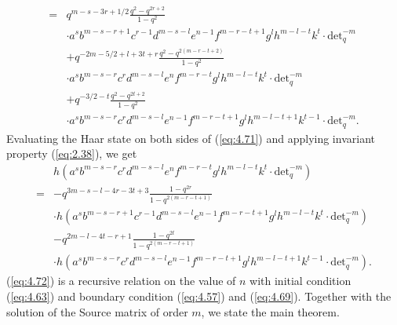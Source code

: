 \documentclass[table,a4paper,reqno]{amsart}
\numberwithin{equation}{section}
\theoremstyle{definition}
\begin{document}
\begin{equation}
\begin{split}
        =&q^{m-s-3r+1/2}\frac{q^2-q^{2r+2}}{1-q^2}\\
        &\cdot a^sb^{m-s-r+1}c^{r-1}d^{m-s-l}e^{n-1}f^{m-r-t+1}g^lh^{m-l-t}k^t\cdot\text{det}_q^{-m}\\
        &+q^{-2m-5/2+l+3t+r}\frac{q^2-q^{2(m-r-t+2)}}{1-q^2}\\
        &\cdot a^sb^{m-s-r}c^rd^{m-s-l}e^{n}f^{m-r-t}g^lh^{m-l-t}k^t\cdot\text{det}_q^{-m}\\
        &+q^{-3/2-t}\frac{q^2-q^{2t+2}}{1-q^2}\\
        &\cdot a^sb^{m-s-r}c^rd^{m-s-l}e^{n-1}f^{m-r-t+1}g^lh^{m-l-t+1}k^{t-1}\cdot\text{det}_q^{-m}.
    \end{split}
\end{equation}
Evaluating the Haar state on both sides of (\ref{eq:4.71}) and applying invariant property (\ref{eq:2.38}), we get
\begin{equation}\label{eq:4.72}
    \begin{split}
        &h\left(a^sb^{m-s-r}c^rd^{m-s-l}e^{n}f^{m-r-t}g^lh^{m-l-t}k^t\cdot\text{det}_q^{-m}\right)\\
        =&-q^{3m-s-l-4r-3t+3}\frac{1-q^{2r}}{1-q^{2(m-r-t+1)}}\\
        &\cdot h\left(a^sb^{m-s-r+1}c^{r-1}d^{m-s-l}e^{n-1}f^{m-r-t+1}g^lh^{m-l-t}k^t\cdot\text{det}_q^{-m}\right)\\
        &-q^{2m-l-4t-r+1}\frac{1-q^{2t}}{1-q^{2(m-r-t+1)}}\\
        &\cdot h\left(a^sb^{m-s-r}c^rd^{m-s-l}e^{n-1}f^{m-r-t+1}g^lh^{m-l-t+1}k^{t-1}\cdot\text{det}_q^{-m}\right).
    \end{split}
\end{equation}
(\ref{eq:4.72}) is a recursive relation on the value of $n$ with initial condition (\ref{eq:4.63}) and boundary condition (\ref{eq:4.57}) and (\ref{eq:4.69}). Together with the solution of the Source matrix of order $m$, we state the main theorem.
\end{document}
